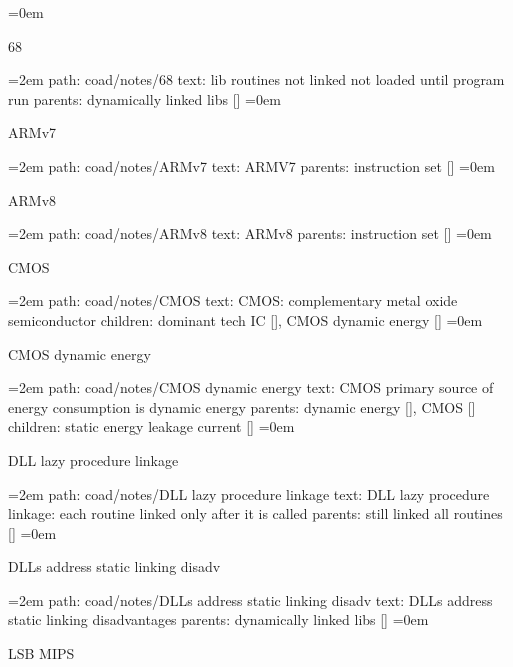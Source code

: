 \leftskip=0em
\par\endgroup
\bigskip
{}
68
\smallskip
\par\begingroup
\leftskip=2em
path: coad/notes/68
\smallskip
text:  lib routines not linked not loaded until program run
\smallskip
parents:  dynamically linked libs []
\smallskip
\leftskip=0em
\par\endgroup
\bigskip
{}
ARMv7
\smallskip
\par\begingroup
\leftskip=2em
path: coad/notes/ARMv7
\smallskip
text:  ARMV7
\smallskip
parents:  instruction set []
\smallskip
\leftskip=0em
\par\endgroup
\bigskip
{}
ARMv8
\smallskip
\par\begingroup
\leftskip=2em
path: coad/notes/ARMv8
\smallskip
text:  ARMv8
\smallskip
parents:  instruction set []
\smallskip
\leftskip=0em
\par\endgroup
\bigskip
{}
CMOS
\smallskip
\par\begingroup
\leftskip=2em
path: coad/notes/CMOS
\smallskip
text:  CMOS: complementary metal oxide semiconductor
\smallskip
children: dominant tech IC [], CMOS dynamic energy []
\smallskip
\leftskip=0em
\par\endgroup
\bigskip
{}
CMOS dynamic energy
\smallskip
\par\begingroup
\leftskip=2em
path: coad/notes/CMOS dynamic energy
\smallskip
text:  CMOS primary source of energy consumption is dynamic energy
\smallskip
parents:  dynamic energy [], CMOS []
\smallskip
children: static energy leakage current []
\smallskip
\leftskip=0em
\par\endgroup
\bigskip
{}
DLL lazy procedure linkage
\smallskip
\par\begingroup
\leftskip=2em
path: coad/notes/DLL lazy procedure linkage
\smallskip
text:  DLL lazy procedure linkage: each routine linked only after it is called
\smallskip
parents:  still linked all routines []
\smallskip
\leftskip=0em
\par\endgroup
\bigskip
{}
DLLs address static linking disadv
\smallskip
\par\begingroup
\leftskip=2em
path: coad/notes/DLLs address static linking disadv
\smallskip
text:  DLLs address static linking disadvantages
\smallskip
parents:  dynamically linked libs []
\smallskip
\leftskip=0em
\par\endgroup
\bigskip
{}
LSB MIPS
\smallskip
